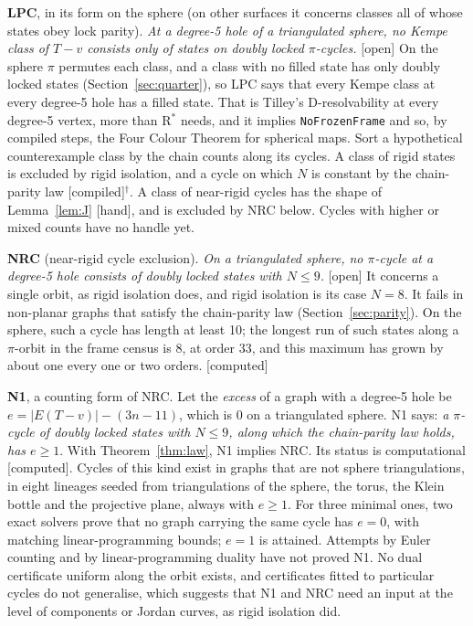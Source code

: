\documentclass[11pt]{article}
\newcommand{\lab}[1]{\textsf{[#1]}}
\begin{document}
\textbf{LPC}, in its form on the sphere (on other surfaces it concerns classes all of whose states obey lock parity). \emph{At a degree-5 hole of a triangulated sphere, no Kempe class of $T-v$ consists only of states on doubly locked $\pi$-cycles.} \lab{open} On the sphere $\pi$ permutes each class, and a class with no filled state has only doubly locked states (Section~\ref{sec:quarter}), so LPC says that every Kempe class at every degree-5 hole has a filled state. That is Tilley's D-resolvability at every degree-5 vertex, more than R$^\ast$ needs, and it implies \texttt{NoFrozenFrame} and so, by compiled steps, the Four Colour Theorem for spherical maps. Sort a hypothetical counterexample class by the chain counts along its cycles. A class of rigid states is excluded by rigid isolation, and a cycle on which $N$ is constant by the chain-parity law \lab{compiled}$^\dagger$. A class of near-rigid cycles has the shape of Lemma~\ref{lem:J} \lab{hand}, and is excluded by NRC below. Cycles with higher or mixed counts have no handle yet.

\textbf{NRC} (near-rigid cycle exclusion). \emph{On a triangulated sphere, no $\pi$-cycle at a degree-5 hole consists of doubly locked states with $N\le9$.} \lab{open} It concerns a single orbit, as rigid isolation does, and rigid isolation is its case $N=8$. It fails in non-planar graphs that satisfy the chain-parity law (Section~\ref{sec:parity}). On the sphere, such a cycle has length at least 10; the longest run of such states along a $\pi$-orbit in the frame census is 8, at order 33, and this maximum has grown by about one every one or two orders. \lab{computed}

\textbf{N1}, a counting form of NRC. Let the \emph{excess} of a graph with a degree-5 hole be $e=|E(T-v)|-(3n-11)$, which is $0$ on a triangulated sphere. N1 says: \emph{a $\pi$-cycle of doubly locked states with $N\le9$, along which the chain-parity law holds, has $e\ge1$}. With Theorem~\ref{thm:law}, N1 implies NRC. Its status is computational \lab{computed}. Cycles of this kind exist in graphs that are not sphere triangulations, in eight lineages seeded from triangulations of the sphere, the torus, the Klein bottle and the projective plane, always with $e\ge1$. For three minimal ones, two exact solvers prove that no graph carrying the same cycle has $e=0$, with matching linear-programming bounds; $e=1$ is attained. Attempts by Euler counting and by linear-programming duality have not proved N1. No dual certificate uniform along the orbit exists, and certificates fitted to particular cycles do not generalise, which suggests that N1 and NRC need an input at the level of components or Jordan curves, as rigid isolation did.
\end{document}
